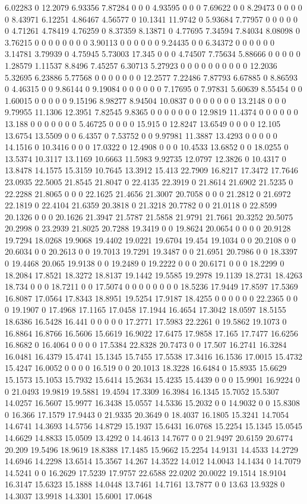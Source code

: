 6.02283 0 12.2079 6.93356 7.87284 0 0 0 4.93595 0 0 0 7.69622 0 0 8.29473 0 0 0 0 0 8.43971 6.12251 4.86467 4.56577 0 10.1341 11.9742 0 5.93684 7.77957 0 0 0 0 0 0 4.71261 4.78419 4.76259 0 8.37359 8.13871 0 4.77695 7.34594 7.84034 8.08098 0 3.76215 0 0 0 0 0 0 0 0 3.90113 0 0 0 0 0 0 9.24435 0 0 6.34372 0 0 0 0 0 0 3.14781 3.79939 0 4.75945 5.73003 17.345 0 0 0 4.74507 7.75634 5.88666 0 0 0 0 0 1.28579 1.11537 8.8496 7.45257 6.30713 5.27923 0 0 0 0 0 0 0 0 0 0 12.2036 5.32695 6.23886 5.77568 0 0 0 0 0 0 0 12.2577 7.22486 7.87793 6.67885 0 8.86593 0 4.46315 0 0 9.86144 0 9.19084 0 0 0 0 0 0 7.17695 0 7.97831 5.60639 8.55454 0 0 1.60015 0 0 0 0 0 9.15196 8.98277 8.94504 10.0837 0 0 0 0 0 0 0 13.2148 0 0 0 9.79955 11.1306 12.3951 7.82545 9.8365 0 0 0 0 0 0 0 12.9819 11.4374 0 0 0 0 0 0 13.188 0 0 0 0 0 0 0 5.46725 0 0 0 0 15.915 0 12.8247 13.6549 0 0 0 0 12.105 13.6754 13.5509 0 0 6.4357 0 7.53752 0 0 9.97981 11.3887 13.4293 0 0 0 0 0 14.1516 0 10.3416 0 0 0 17.0322 0 12.4908 0 0 0 10.4533 13.6852 0 0 18.0255 0 13.5374 10.3117 13.1169 10.6663 11.5983 9.92735 12.0797 12.3826 0 10.4317 0 13.8478 14.1575 15.3159 10.7645 13.3912 15.413 22.7909 16.8217 17.3472 17.7646 23.0935 22.5005 21.8545 21.8047 0 22.4135 22.3919 0 21.8614 21.6902 21.5235 0 22.2288 21.8065 0 0 0 22.1625 21.4656 21.3007 20.7058 0 0 0 21.2812 0 21.6972 22.1819 0 22.4104 21.6359 20.3818 0 21.3218 20.7782 0 0 21.0118 0 22.8599 20.1326 0 0 0 20.1626 21.3947 21.5787 21.5858 21.9791 21.7661 20.3252 20.5075 20.2998 0 23.2939 21.8025 20.7288 19.3419 0 0 19.8624 20.0654 0 0 0 0 20.9128 19.7294 18.0268 19.9068 19.4402 19.0221 19.6704 19.454 19.1034 0 0 20.2108 0 0 20.6034 0 0 20.2613 0 0 19.7013 19.7291 19.3487 0 0 21.6951 20.7986 0 0 18.3397 0 19.4468 20.065 19.9138 0 0 19.2489 0 19.2222 0 0 0 20.6171 0 0 0 18.2299 0 18.2084 17.8521 18.3272 18.8137 19.1442 19.5585 19.2978 19.1139 18.2731 18.4263 18.734 0 0 0 18.7211 0 0 17.5074 0 0 0 0 0 0 0 0 18.5236 17.9449 17.8597 17.5369 16.8087 17.0564 17.8343 18.8951 19.5254 17.9187 18.4255 0 0 0 0 0 0 22.2365 0 0 0 19.1907 0 17.4968 17.1165 17.0458 17.1944 16.4654 17.3042 18.0597 18.5155 18.6386 16.5428 16.441 0 0 0 0 0 17.2771 17.5983 22.2261 0 19.5862 19.1073 0 16.8864 16.8766 16.5606 15.6619 16.9022 17.6475 17.9858 17.165 17.7477 16.6256 16.8682 0 16.4064 0 0 0 0 17.5384 22.8328 20.7473 0 0 17.507 16.2741 16.3284 16.0481 16.4379 15.4741 15.1345 15.7455 17.5538 17.3416 16.1536 17.0015 15.4732 15.4247 16.0052 0 0 0 0 16.519 0 0 20.1013 18.3228 16.6484 0 15.8935 15.6629 15.1573 15.1053 15.7932 15.6414 15.2634 15.4235 15.4439 0 0 0 15.9901 16.9224 0 0 21.0493 19.9819 19.5881 19.4594 17.3309 16.3984 16.1345 15.7052 15.5307 14.0257 16.5607 15.9977 16.3438 15.0557 14.5336 15.2032 0 0 14.9032 0 0 15.8308 0 16.366 17.1579 17.9443 0 21.9335 20.3649 0 18.4037 16.1805 15.3241 14.7054 14.6741 14.3693 14.5756 14.8729 15.1937 15.6431 16.0768 15.2254 15.1345 15.0545 14.6629 14.8833 15.0509 13.4292 0 14.4613 14.7677 0 0 21.9497 20.6159 20.6774 20.209 19.5496 18.9619 18.8388 17.1485 15.9662 15.2254 14.9131 14.4533 14.2729 14.6946 14.2298 13.6514 15.3567 14.267 14.3522 14.012 14.0043 14.1434 0 14.7079 14.5241 0 0 16.2629 17.5239 17.9757 22.6588 22.0202 20.0022 19.1514 18.9104 16.3147 15.6323 15.1888 14.0448 13.7461 14.7161 13.7877 0 0 13.63 13.9328 0 14.3037 13.9918 14.3301 15.6001 17.0648 
